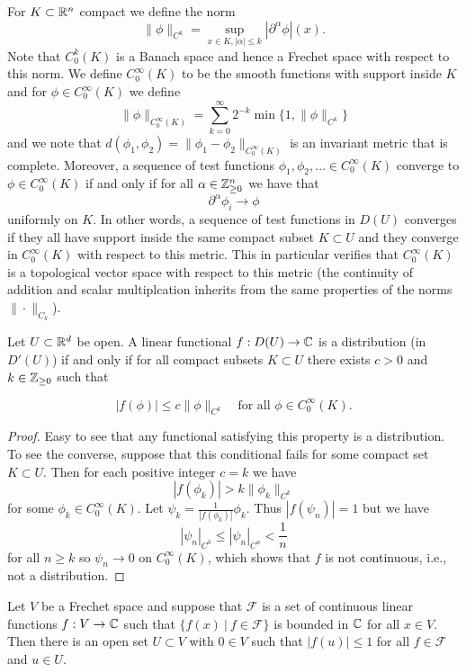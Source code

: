 \documentclass[twoside, a4paper, 10pt]{amsart}
\begin{document}
For $K \subset \mathbb{R}^n$ compact we define the norm $$\| \phi \|_{C^k} = \sup_{x \in K, |\alpha| \leq k} |\partial^{\alpha} \phi| (x).$$ Note that $C_0^k(K)$ is a Banach space and hence a Frechet space with respect to this norm. We define $C_0^{\infty}(K)$ to be the smooth functions with support inside $K$ and for $\phi \in C_0^{\infty}(K)$ we define $$\|\phi\|_{C_0^{\infty}(K)} = \sum_{k=0}^{\infty} 2^{-k} \min\{1, \| \phi \|_{C^k} \} $$ and we note that $d(\phi_1, \phi_2) = \| \phi_1 - \phi_2 \|_{C_0^{\infty}(K)}$ is an invariant metric that is complete. Moreover, a sequence of test functions $\phi_1, \phi_2, \ldots \in C_0^{\infty}(K)$ converge to $\phi \in C_0^{\infty}(K)$ if and only if for all $\alpha \in \mathbb{Z}_{\geq 0}^n$ we have that $$\partial^{\alpha} \phi_i \to \phi$$ uniformly on $K$. In other words, a sequence of test functions in $D(U)$ converges if they all have support inside the same compact subset $K \subset U$ and they converge in $C_0^{\infty}(K)$ with respect to this metric. This in particular verifies that $C_0^{\infty}(K)$ is a topological vector space with respect to this metric (the continuity of addition and scalar multiplcation inherits from the same properties of the norms $\|\cdot \|_{C_k}$).

\begin{thm} \label{thm: distributions are lipschitz on compact sets} Let $U \subset \mathbb{R}^d$ be open. A linear functional $f:D(U) \to \mathbb{C}$ is a distribution (in $D'(U)$) if and only if for all compact subsets $K \subset U$ there exists $c>0$ and $k \in \mathbb{Z}_{\geq 0}$ such that

$$ |f(\phi)| \leq c \|\phi\|_{C^k} \quad \text{for all } \phi \in C_0^{\infty}(K).$$

\end{thm}

\begin{proof} Easy to see that any functional satisfying this property is a distribution. To see the converse, suppose that this conditional fails for some compact set $K \subset U$. Then for each positive integer $c = k$ we have $$|f(\phi_k)| > k \|\phi_k\|_{C^k}$$ for some $\phi_k \in C_0^{\infty}(K)$. Let $\psi_k = \frac{1}{|f(\phi_k)|} \phi_k$. Thus $|f(\psi_n)| = 1$ but we have $$|\psi_n|_{C^k} \leq |\psi_n|_{C^n} < \frac{1}{n}$$ for all $n \geq k$ so $\psi_n \to 0$ on $C_0^{\infty}(K)$, which shows that $f$ is not continuous, i.e., not a distribution. \end{proof}

\begin{thm} Let $V$ be a Frechet space and suppose that $\mathcal{F}$ is a set of continuous linear functions $f:V \to \mathbb{C}$ such that $\{ f(x) ~|~ f \in \mathcal{F} \}$ is bounded in $\mathbb{C}$ for all $x \in V$. Then there is an open set $U \subset V$ with $0 \in V$ such that $|f(u)| \leq 1$ for all $f \in \mathcal{F}$ and $u \in U$. \end{thm}
\end{document}
